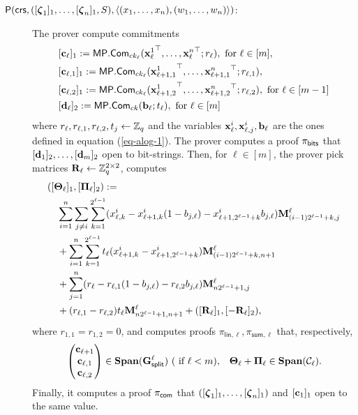 \begin{description}
\item[{\(\mathsf{P}(\mathsf{crs}, ([{\boldsymbol \zeta}_1]_1, \ldots, [{\boldsymbol \zeta}_n]_1,S), \langle (x_1,\ldots,x_n),(w_1,\ldots,w_n) \rangle)\)}:]
The prover compute commitments
\begin{align*}
&[\mathbf{c}_\ell]_1:=\mathsf{MP}.\mathsf{Com}_{ck_\ell}({\mathbf{x}_\ell^1}^\top,\ldots,{\mathbf{x}_\ell^n}^\top;r_\ell), \text{ for } \ell \in [m],\\
&[\mathbf{c}_{\ell,1}]_1:=\mathsf{MP}.\mathsf{Com}_{ck_\ell}({\mathbf{x}^1_{\ell+1,1}}^\top,\ldots,{\mathbf{x}^n_{\ell+1,1}}^\top;r_{\ell,1}),\\
&[\mathbf{c}_{\ell,2}]_1:=\mathsf{MP}.\mathsf{Com}_{ck_\ell}({\mathbf{x}^1_{\ell+1,2}}^\top,\ldots,{\mathbf{x}^n_{\ell+1,2}}^\top;r_{\ell,2}), \text{ for } \ell\in[m-1]\\
&[\mathbf{d}_\ell]_2:=\mathsf{MP}.\mathsf{Com}_{ck}(\mathbf{b}_\ell;t_\ell),\text{ for } \ell\in[m]
\end{align*}
 where \(r_\ell,r_{\ell,1},r_{\ell,2},t_j\gets\mathbb{Z}_q\) and the variables \(\mathbf{x}^i_\ell,\mathbf{x}^i_{\ell,j},\mathbf{b}_\ell\) are the ones defined in equation (\ref{eq-alog-1}). The prover computes a proof \(\pi_{\mathsf{bits}}\) that \([\mathbf{d}_1]_2,\ldots,[\mathbf{d}_m]_2\) open to bit-strings. Then, for \(\ell\in [m]\), the prover pick matrices \(\mathbf{{R}}_\ell\gets\mathbb{Z}_q^{2\times 2}\), computes
\begin{align*}
&([\mathbf{{\Theta}}_\ell]_1,[\mathbf{{\Pi}}_\ell]_2)  := \\
&\quad \sum_{i=1}^n\sum_{j\neq i}\sum_{k=1}^{2^{\ell-1}}(x^i_{\ell,k}-x^i_{\ell+1,k}(1-b_{j,\ell})-x^i_{\ell+1,2^{\ell-1}+k}b_{j,\ell})\mathbf{{M}}_{(i-1)2^{\ell-1}+k,j}^\ell\\
&\quad+ \sum_{i=1}^n\sum_{k=1}^{2^{\ell-1}}t_\ell(x^i_{\ell+1,k}-x^i_{\ell+1,2^{\ell-1}+k})\mathbf{{M}}_{(i-1)2^{\ell-1}+k,n+1}^\ell \\
&\quad+ \sum_{j=1}^n (r_\ell-r_{\ell,1}(1-b_{j,\ell})-r_{\ell,2}b_{j,\ell})\mathbf{{M}}_{n2^{\ell-1}+1,j}^\ell \\
&\quad+(r_{\ell,1}-r_{\ell,2})t_\ell\mathbf{{M}}^\ell_{n2^{\ell-1}+1,n+1}+([\mathbf{{R}}_\ell]_1,[-\mathbf{{R}}_\ell]_2),
\end{align*}
where \(r_{1,1}=r_{1,2}=0\), and computes proofs $\pi_{\mathsf{lin},\ell},\pi_{\mathsf{sum},\ell}$ that, respectively,
\begin{align*}
&\begin{pmatrix}
\mathbf{c}_{\ell+1}\\\mathbf{c}_{\ell,1}\\\mathbf{c}_{\ell,2}
\end{pmatrix}\in
\mathbf{Span}(\mathbf{{G}}^{\ell}_\mathsf{split})\ (\text{ if }\ell< m), &\mathbf{{\Theta_\ell}}+\mathbf{{\Pi_\ell}}\in\mathbf{Span}(\mathcal{C}_\ell).
\end{align*}
Finally, it computes a proof \(\pi_{\mathsf{com}}\) that \(([{\boldsymbol \zeta}_1]_1,\ldots,[{\boldsymbol \zeta}_n]_1)\) and \([\mathbf{c}_1]_1\) open to the same value.


\end{description}
